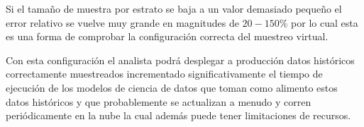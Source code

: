 Si el tamaño de muestra por estrato se baja a un valor demasiado pequeño el error relativo se vuelve muy grande en magnitudes de $20-150\%$ por lo cual esta es una forma de comprobar la configuración correcta del muestreo virtual.

\bigbreak

Con esta configuración el analista podrá desplegar a producción datos históricos correctamente muestreados incrementado significativamente el tiempo de ejecución de los modelos de ciencia de datos que toman como alimento estos datos históricos y que probablemente se actualizan a menudo y corren periódicamente en la nube la cual además puede tener limitaciones de recursos.
